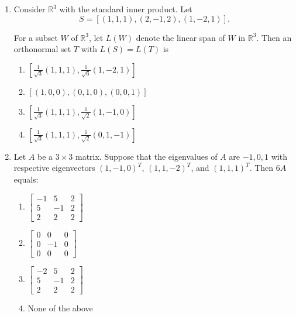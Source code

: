 \documentclass[journal]{IEEEtran}
\newcommand{\brak}[1]{\left( #1 \right)}
\newcommand{\sbrak}[1]{\left[ #1 \right]}
\begin{document}
\begin{enumerate}
    \begin{multicols}{4}
    \begin{enumerate}
        \item $\sbrak{\brak{1, 1, -1, 0}, \brak{0, 1, 1, 1}, \brak{2, 1, -3, 1}}$
        \item $\sbrak{\brak{1, -1, 0, 1}}$
        \item $\sbrak{\brak{1, 0, 1, -1}}$
        \item $\sbrak{\brak{1, -1, 0, 1}, \brak{1, 0, 1, -1}}$
    \end{enumerate}
    \end{multicols}

   \item Consider $\mathbb{R}^3$ with the standard inner product. Let
   \[S=\sbrak{\brak{1,1,1}, \brak{2,-1,2}, \brak{1,-2,1}}.\]

    For a subset $W$ of $\mathbb{R}^3$, let $L\brak{W}$ denote the linear span of $W$ in $\mathbb{R}^3$. Then an orthonormal set $T$ with $L\brak{S}=L\brak{T}$ is 
  
    \begin{enumerate}
      \item $\sbrak{\frac{1}{\sqrt{3}}\brak{1,1,1}, \frac{1}{\sqrt{6}}\brak{1,-2,1}}$
      \item $\sbrak{\brak{1,0,0}, \brak{0,1,0}, \brak{0,0,1}}$
      \item $\sbrak{\frac{1}{\sqrt{3}}\brak{1,1,1}, \frac{1}{\sqrt{2}}\brak{1,-1,0}}$
      \item $\sbrak{\frac{1}{\sqrt{3}}\brak{1,1,1}, \frac{1}{\sqrt{2}}\brak{0,1,-1}}$
    \end{enumerate}

  \item Let $A$ be a $3\times3$ matrix. Suppose that the eigenvalues of $A$ are $-1,0,1$ with respective
eigenvectors $\brak{1,-1,0}^T$, $\brak{1,1,-2}^T$, and $\brak{1,1,1}^T$. Then $6A$ equals:

    \begin{enumerate}
      \item $\begin{bmatrix}
        -1 & 5 & 2 \\
        5 & -1 & 2 \\
        2 & 2 & 2
      \end{bmatrix}$
      \item $\begin{bmatrix}
        0 & 0 & 0 \\
        0 & -1 & 0 \\
        0 & 0 & 0
      \end{bmatrix}$
      \item $\begin{bmatrix}
        -2 & 5 & 2 \\
        5 & -1 & 2 \\
        2 & 2 & 2
      \end{bmatrix}$
      \item None of the above
    \end{enumerate}


\end{enumerate}
\end{document}
